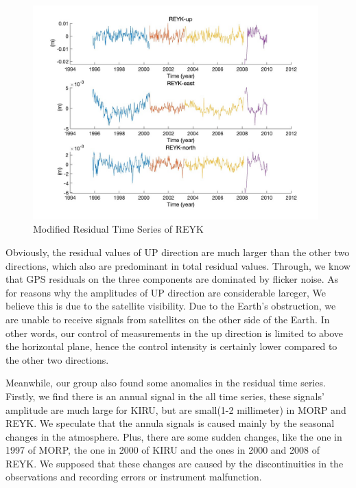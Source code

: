 \documentclass{article}
\begin{document}
\begin{figure}[H]
  \centering
  \includegraphics[width=11cm]{../result/re_figure/fig_REYK/figure3.jpg}
  \caption{Modified Residual Time Series of REYK}
  \label{fig:nRes_REYK}
\end{figure}

Obviously, the residual values of UP direction are much larger than the other two directions, which also are predominant in total residual values.
Through, we know that GPS residuals on the three components are dominated by flicker noise.
As for reasons why the amplitudes of UP direction are considerable lareger, 
We believe this is due to the satellite visibility. 
Due to the Earth's obstruction, we are unable to receive signals from satellites on the other side of the Earth. 
In other words, our control of measurements in the up direction is limited to above the horizontal plane, 
hence the control intensity is certainly lower compared to the other two directions.

Meanwhile, our group also found some anomalies in the residual time series. Firstly, we find there is an annual signal in the all time series, 
these signals' amplitude are much large for KIRU, but are small(1-2 millimeter) in MORP and REYK. 
We speculate that the annula signals is caused mainly by the seasonal changes in the atmosphere.
Plus, there are some sudden changes, like the one in 1997 of MORP, the one in 2000 of KIRU and the ones in 2000 and 2008 of REYK.
We supposed that these changes are caused by the discontinuities in the observations and recording errors or instrument malfunction.
\end{document}
